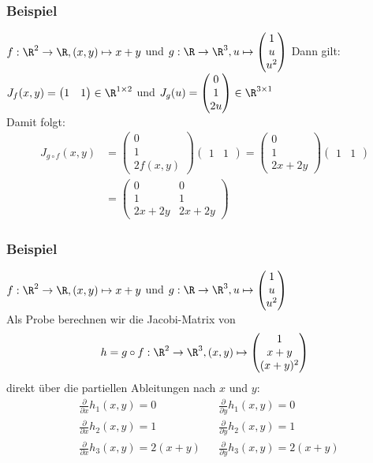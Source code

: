 %
%
\begin{frame}\frametitle{Beispiel}
$f: \R^2 \to \R, (x,y)  \mapsto x+y$ und $g: \R \to \R^3, u \mapsto \begin{pmatrix} 1 \\ u \\ u^2 \end{pmatrix} $
Dann gilt:
$J_f(x,y)=\begin{pmatrix} 1 & 1  \end{pmatrix} \in \R^{1 \times 2}$ und $J_g(u)=\begin{pmatrix} 0 \\ 1 \\ 2u \end{pmatrix} \in \R^{3 \times 1}$\\
\pause Damit folgt: 
\begin{align*}
J_{g\circ f}(x,y)&=\begin{pmatrix} 0 \\ 1 \\ 2f(x,y) \end{pmatrix}\begin{pmatrix} 1 & 1  \end{pmatrix}=\begin{pmatrix} 0 \\ 1 \\ 2x+2y \end{pmatrix}\begin{pmatrix} 1 & 1  \end{pmatrix}\\
&=\begin{pmatrix} 0 & 0 \\ 1 & 1 \\ 2x+2y & 2x+2y \end{pmatrix}
\end{align*}

\end{frame}
%
%
\begin{frame}\frametitle{Beispiel}
$f: \R^2 \to \R, (x,y)  \mapsto x+y$ und $g: \R \to \R^3, u \mapsto \begin{pmatrix} 1 \\ u \\ u^2 \end{pmatrix} $\\
Als Probe berechnen wir die Jacobi-Matrix von 
$$
h=g \circ f : \R^2 \to \R^3, (x,y) \mapsto \begin{pmatrix}1 \\ x+y \\ (x+y)^2 \end{pmatrix}
$$
direkt über die partiellen Ableitungen nach $x$ und $y$:\pause
\begin{align*}
&\frac{\partial}{\partial x}h_1(x,y)=0 &&\frac{\partial}{\partial y}h_1(x,y)=0\\
&\frac{\partial}{\partial x}h_2(x,y)=1 &&\frac{\partial}{\partial y}h_2(x,y)=1 \\
&\frac{\partial}{\partial x}h_3(x,y)=2(x+y)&&\frac{\partial}{\partial y}h_3(x,y)=2(x+y)
\end{align*}
\end{frame}
%
